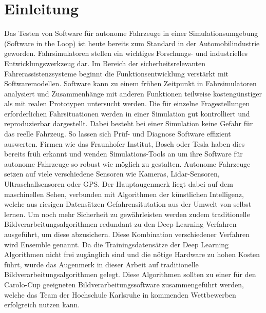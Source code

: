 %


\chapter{Einleitung}
\label{cha:Einleitung} 
Das Testen von Software f{\"u}r autonome Fahrzeuge in einer Simulationsumgebung (Software in the Loop) ist heute bereits zum Standard in der Automobilindustrie geworden.
Fahrsimulatoren stellen ein wichtiges Forschungs- und industrielles Entwicklungswerkzeug dar. Im Bereich der sicherheitsrelevanten Fahrerassistenzsysteme beginnt die Funktionsentwicklung verst{\"a}rkt mit Softwaremodellen. Software kann zu einem fr{\"u}hen Zeitpunkt in Fahrsimulatoren analysiert und Zusammenh{\"a}nge mit anderen Funktionen teilweise kosteng{\"u}nstiger als mit realen Prototypen untersucht werden. Die f{\"u}r einzelne Fragestellungen erforderlichen Fahrsituationen werden in einer Simulation gut kontrolliert und reproduzierbar dargestellt. Dabei besteht bei einer Simulation keine Gefahr f{\"u}r das reelle Fahrzeug. So lassen sich Pr{\"u}f- und Diagnose Software effizient auswerten. Firmen wie das Fraunhofer Institut, Bosch oder Tesla haben dies bereits fr\"uh erkannt und wenden Simulations-Tools an um ihre Software f\"ur autonome Fahrzeuge so robust wie m\"oglich zu gestalten. Autonome Fahrzeuge setzen auf viele verschiedene Sensoren wie Kameras, Lidar-Sensoren, Ultraschallsensoren oder GPS. Der Hauptaugenmerk liegt dabei auf dem maschinellen Sehen, verbunden mit Algorithmen der k\"unstlichen Intelligenz, welche aus riesigen Datens\"atzen Gefahrensitutation aus der Umwelt von selbst lernen. Um noch mehr Sicherheit zu gew\"ahrleisten werden zudem traditionelle Bildverarbeitungsalgorithmen redundant zu den Deep Learning Verfahren ausgef\"uhrt, um diese abzusichern. Diese Kombination verschiedener Verfahren wird Ensemble genannt.
Da die Trainingsdatens\"atze der Deep Learning Algorithmen nicht frei zug\"anglich sind und die n\"otige Hardware zu hohen Kosten f\"uhrt, wurde das Augenmerk in dieser Arbeit auf traditionelle Bildverarbeitungsalgorithmen gelegt.
Diese Algorithmen sollten zu einer f\"ur den Carolo-Cup geeigneten Bildverarbeitungssoftware zusammengef\"uhrt werden, welche das Team der Hochschule Karlsruhe in kommenden Wettbewerben erfolgreich nutzen kann.


